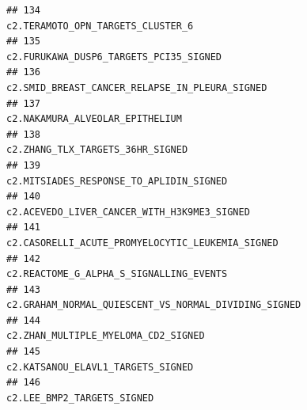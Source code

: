 \documentclass{article}\usepackage[]{graphicx}\usepackage[]{color}
\makeatletter
\newenvironment{kframe}{%
 \def\at@end@of@kframe{}%
 \ifinner\ifhmode%
  \def\at@end@of@kframe{\end{minipage}}%
  \begin{minipage}{\columnwidth}%
 \fi\fi%
 \def\FrameCommand##1{\hskip\@totalleftmargin \hskip-\fboxsep
 \colorbox{shadecolor}{##1}\hskip-\fboxsep
     \hskip-\linewidth \hskip-\@totalleftmargin \hskip\columnwidth}%
 \MakeFramed {\advance\hsize-\width
   \@totalleftmargin\z@ \linewidth\hsize
   \@setminipage}}%
 {\par\unskip\endMakeFramed%
 \at@end@of@kframe}
\newenvironment{knitrout}{}{} %
\makeatother
\begin{document}
\begin{knitrout}
\begin{kframe}
\begin{verbatim}
## 134                                                                                                                                                                                c2.TERAMOTO_OPN_TARGETS_CLUSTER_6
## 135                                                                                                                                                                           c2.FURUKAWA_DUSP6_TARGETS_PCI35_SIGNED
## 136                                                                                                                                                                   c2.SMID_BREAST_CANCER_RELAPSE_IN_PLEURA_SIGNED
## 137                                                                                                                                                                                  c2.NAKAMURA_ALVEOLAR_EPITHELIUM
## 138                                                                                                                                                                                 c2.ZHANG_TLX_TARGETS_36HR_SIGNED
## 139                                                                                                                                                                          c2.MITSIADES_RESPONSE_TO_APLIDIN_SIGNED
## 140                                                                                                                                                                      c2.ACEVEDO_LIVER_CANCER_WITH_H3K9ME3_SIGNED
## 141                                                                                                                                                                 c2.CASORELLI_ACUTE_PROMYELOCYTIC_LEUKEMIA_SIGNED
## 142                                                                                                                                                                          c2.REACTOME_G_ALPHA_S_SIGNALLING_EVENTS
## 143                                                                                                                                                             c2.GRAHAM_NORMAL_QUIESCENT_VS_NORMAL_DIVIDING_SIGNED
## 144                                                                                                                                                                              c2.ZHAN_MULTIPLE_MYELOMA_CD2_SIGNED
## 145                                                                                                                                                                                c2.KATSANOU_ELAVL1_TARGETS_SIGNED
## 146                                                                                                                                                                                       c2.LEE_BMP2_TARGETS_SIGNED

\end{verbatim}
\end{kframe}
\end{knitrout}
\end{document}
